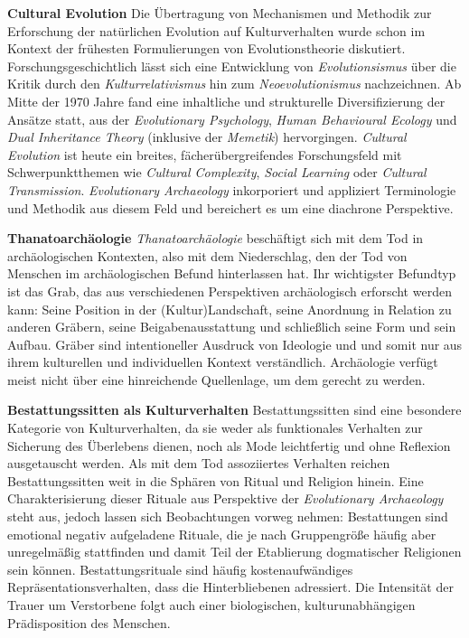 \documentclass[openany,twoside,twocolumn]{book}
\begin{document}
\textbf{Cultural Evolution} \newline  Die Übertragung von Mechanismen
und Methodik zur Erforschung der natürlichen Evolution auf
Kulturverhalten wurde schon im Kontext der frühesten Formulierungen von
Evolutionstheorie diskutiert. Forschungsgeschichtlich lässt sich eine
Entwicklung von \emph{Evolutionsismus} über die Kritik durch den
\emph{Kulturrelativismus} hin zum \emph{Neoevolutionismus} nachzeichnen.
Ab Mitte der 1970 Jahre fand eine inhaltliche und strukturelle
Diversifizierung der Ansätze statt, aus der \emph{Evolutionary
Psychology}, \emph{Human Behavioural Ecology} und \emph{Dual Inheritance
Theory} (inklusive der \emph{Memetik}) hervorgingen. \emph{Cultural
Evolution} ist heute ein breites, fächerübergreifendes Forschungsfeld
mit Schwerpunktthemen wie \emph{Cultural Complexity}, \emph{Social
Learning} oder \emph{Cultural Transmission}. \emph{Evolutionary
Archaeology} inkorporiert und appliziert Terminologie und Methodik aus
diesem Feld und bereichert es um eine diachrone Perspektive.

\textbf{Thanatoarchäologie} \newline  \emph{Thanatoarchäologie}
beschäftigt sich mit dem Tod in archäologischen Kontexten, also mit dem
Niederschlag, den der Tod von Menschen im archäologischen Befund
hinterlassen hat. Ihr wichtigster Befundtyp ist das Grab, das aus
verschiedenen Perspektiven archäologisch erforscht werden kann: Seine
Position in der (Kultur)Landschaft, seine Anordnung in Relation zu
anderen Gräbern, seine Beigabenausstattung und schließlich seine Form
und sein Aufbau. Gräber sind intentioneller Ausdruck von Ideologie und
und somit nur aus ihrem kulturellen und individuellen Kontext
verständlich. Archäologie verfügt meist nicht über eine hinreichende
Quellenlage, um dem gerecht zu werden.

\textbf{Bestattungssitten als Kulturverhalten} \newline 
Bestattungssitten sind eine besondere Kategorie von Kulturverhalten, da
sie weder als funktionales Verhalten zur Sicherung des Überlebens
dienen, noch als Mode leichtfertig und ohne Reflexion ausgetauscht
werden. Als mit dem Tod assoziiertes Verhalten reichen Bestattungssitten
weit in die Sphären von Ritual und Religion hinein. Eine
Charakterisierung dieser Rituale aus Perspektive der \emph{Evolutionary
Archaeology} steht aus, jedoch lassen sich Beobachtungen vorweg nehmen:
Bestattungen sind emotional negativ aufgeladene Rituale, die je nach
Gruppengröße häufig aber unregelmäßig stattfinden und damit Teil der
Etablierung dogmatischer Religionen sein können. Bestattungsrituale sind
häufig kostenaufwändiges Repräsentationsverhalten, dass die
Hinterbliebenen adressiert. Die Intensität der Trauer um Verstorbene
folgt auch einer biologischen, kulturunabhängigen Prädisposition des
Menschen.
\end{document}
